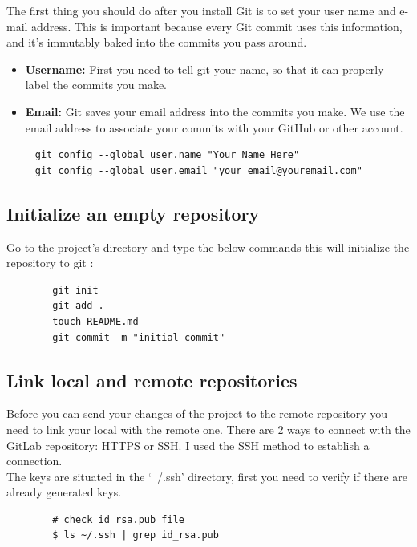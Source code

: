 \documentclass[12pt]{article}
\begin{document}
    The first thing you should do after you install Git is to set your user name and e-mail address.
    This is important because every Git commit uses this information, and it’s immutably baked into
    the commits you pass around.

    \begin{itemize}
      \item \textbf{Username:} First you need to tell git your name, so that it can properly label the commits you make.
      \item \textbf{Email:}  Git saves your email address into the commits you make. We use the email address to associate your commits with your GitHub or other account.
    \end{itemize}

    \begin{lstlisting}
     git config --global user.name "Your Name Here"
     git config --global user.email "your_email@youremail.com"
    \end{lstlisting}

  \subsection{Initialize an empty repository}

    Go to the project’s directory and type the below commands this will initialize
    the repository to git :

    \begin{lstlisting}
        git init
        git add .
        touch README.md
        git commit -m "initial commit"
    \end{lstlisting}

  \subsection{Link local and remote repositories}

    Before you can send your changes of the project to the remote repository
    you need to link your local with the remote one. There are 2 ways to connect
    with the GitLab repository: HTTPS or SSH. I used the SSH method to establish
    a connection. \\

    The keys are situated in the `~/.ssh' directory, first you need to verify if there are
    already generated keys.

    \begin{lstlisting}
        # check id_rsa.pub file
        $ ls ~/.ssh | grep id_rsa.pub
    \end{lstlisting}
\end{document}
